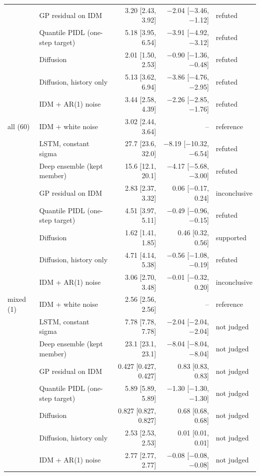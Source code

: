 \begin{table}[htbp]
\begin{tabular}{llrrl}
 & GP residual on IDM & 3.20 [2.43, 3.92] & $-$2.04 [$-$3.46, $-$1.12] & refuted \\
 & Quantile PIDL (one-step target) & 5.18 [3.95, 6.54] & $-$3.91 [$-$4.92, $-$3.12] & refuted \\
 & Diffusion & 2.01 [1.50, 2.53] & $-$0.90 [$-$1.36, $-$0.48] & refuted \\
 & Diffusion, history only & 5.13 [3.62, 6.94] & $-$3.86 [$-$4.76, $-$2.95] & refuted \\
 & IDM + AR(1) noise & 3.44 [2.58, 4.39] & $-$2.26 [$-$2.85, $-$1.76] & refuted \\
\midrule
all (60) & IDM + white noise & 3.02 [2.44, 3.64] & -- & reference \\
 & LSTM, constant sigma & 27.7 [23.6, 32.0] & $-$8.19 [$-$10.32, $-$6.54] & refuted \\
 & Deep ensemble (kept member) & 15.6 [12.1, 20.1] & $-$4.17 [$-$5.68, $-$3.00] & refuted \\
 & GP residual on IDM & 2.83 [2.37, 3.32] & 0.06 [$-$0.17, 0.24] & inconclusive \\
 & Quantile PIDL (one-step target) & 4.51 [3.97, 5.11] & $-$0.49 [$-$0.96, $-$0.15] & refuted \\
 & Diffusion & 1.62 [1.41, 1.85] & 0.46 [0.32, 0.56] & supported \\
 & Diffusion, history only & 4.71 [4.14, 5.38] & $-$0.56 [$-$1.08, $-$0.19] & refuted \\
 & IDM + AR(1) noise & 3.06 [2.70, 3.48] & $-$0.01 [$-$0.32, 0.20] & inconclusive \\
\midrule
mixed (1) & IDM + white noise & 2.56 [2.56, 2.56] & -- & reference \\
 & LSTM, constant sigma & 7.78 [7.78, 7.78] & $-$2.04 [$-$2.04, $-$2.04] & not judged \\
 & Deep ensemble (kept member) & 23.1 [23.1, 23.1] & $-$8.04 [$-$8.04, $-$8.04] & not judged \\
 & GP residual on IDM & 0.427 [0.427, 0.427] & 0.83 [0.83, 0.83] & not judged \\
 & Quantile PIDL (one-step target) & 5.89 [5.89, 5.89] & $-$1.30 [$-$1.30, $-$1.30] & not judged \\
 & Diffusion & 0.827 [0.827, 0.827] & 0.68 [0.68, 0.68] & not judged \\
 & Diffusion, history only & 2.53 [2.53, 2.53] & 0.01 [0.01, 0.01] & not judged \\
 & IDM + AR(1) noise & 2.77 [2.77, 2.77] & $-$0.08 [$-$0.08, $-$0.08] & not judged \\
\bottomrule
\end{tabular}
\end{table}
